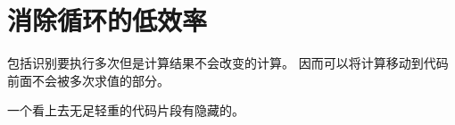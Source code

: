 
\section{消除循环的低效率}
{
    包括识别要执行多次但是计算结果不会改变的计算。
    因而可以将计算移动到代码前面不会被多次求值的部分。

    一个看上去无足轻重的代码片段有隐藏的。
}
